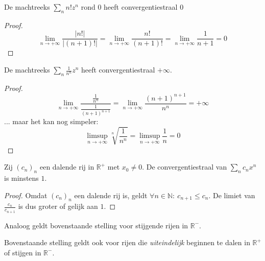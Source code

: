 \documentclass[main.tex]{subfiles}
\begin{document}
\begin{vb}
  De machtreeks $\sum_{n}n!z^{n}$ rond $0$ heeft convergentiestraal $0$
  
  \begin{proof}
    \[
    \lim_{n\rightarrow +\infty}\frac{\left|n!\right|}{\left| (n+1)!\right|}
    = \lim_{n\rightarrow +\infty}\frac{n!}{(n+1)!}
    = \lim_{n\rightarrow +\infty}\frac{1}{n+1}
    = 0
    \]
  \end{proof}
\end{vb}

\begin{vb}
  De machtreeks $\sum_{n}\frac{1}{n^{n}}z^{n}$ heeft convergentiestraal $+\infty$.
  
  \begin{proof}
    \[
    \lim_{n \rightarrow +\infty} \frac{\frac{1}{n^{n}}}{\frac{1}{(n+1)^{n+1}}}
    = \lim_{n \rightarrow +\infty}\frac{(n+1)^{n+1}}{n^{n}}
    = +\infty
    \]
    ... maar het kan nog simpeler:
    \[ \limsup_{n\rightarrow +\infty}\sqrt[n]{\frac{1}{n^{n}}} = \limsup_{n\rightarrow +\infty}\frac{1}{n} = 0 \]
  \end{proof}
\end{vb}

\begin{st}
  Zij $(c_{n})_{n}$ een dalende rij in $\mathbb{R}^{+}$ met $x_{0} \neq 0$.
  De convergentiestraal van $\sum_{n}c_{n}x^{n}$ is minstens $1$.

  \begin{proof}
    Omdat $(c_{n})_{n}$ een dalende rij is, geldt $\forall n\in\mathbb{N}:\ c_{n+1} \le c_{n}$.
    De limiet van $\frac{c_{n}}{c_{n+1}}$ is dus groter of gelijk aan $1$.
  \end{proof}
\end{st}

\begin{opm}
  Analoog geldt bovenstaande stelling voor stijgende rijen in $\mathbb{R}^{-}$.
\end{opm}

\begin{opm}
  Bovenstaande stelling geldt ook voor rijen die \textit{uiteindelijk} beginnen te dalen in $\mathbb{R}^{+}$ of stijgen in $\mathbb{R}^{-}$.
\end{opm}
\end{document}
